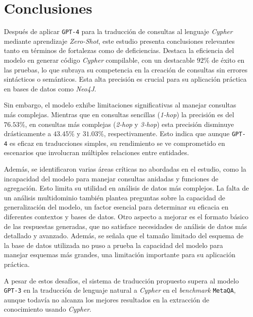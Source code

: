 \chapter*{Conclusiones}\label{chapter:conclusions}
Después de aplicar \texttt{GPT-4} para la traducción de consultas al lenguaje \textit{Cypher} mediante aprendizaje \textit{Zero-Shot}, este estudio presenta conclusiones relevantes tanto en términos de fortalezas como de deficiencias. Destaca la eficiencia del modelo en generar código \textit{Cypher} compilable, con un destacable $92\%$ de éxito en las pruebas, lo que subraya su competencia en la creación de consultas sin errores sintácticos o semánticos. Esta alta precisión es crucial para su aplicación práctica en bases de datos como \textit{Neo4J}.

Sin embargo, el modelo exhibe limitaciones significativas al manejar consultas más complejas. Mientras que en consultas sencillas (\textit{1-hop}) la precisión es del $76.53\%$, en consultas más complejas (\textit{2-hop} y \textit{3-hop}) esta precisión disminuye drásticamente a $43.45\%$ y $31.03\%$, respectivamente. Esto indica que aunque \texttt{GPT-4} es eficaz en traducciones simples, su rendimiento se ve comprometido en escenarios que involucran múltiples relaciones entre entidades.

Además, se identificaron varias áreas críticas no abordadas en el estudio, como la incapacidad del modelo para manejar consultas anidadas y funciones de agregación. Esto limita su utilidad en análisis de datos más complejos. La falta de un análisis multidominio también plantea preguntas sobre la capacidad de generalización del modelo, un factor esencial para determinar su eficacia en diferentes contextos y bases de datos. Otro aspecto a mejorar es el formato básico de las respuestas generadas, que no satisface necesidades de análisis de datos más detallado y avanzado. Además, se señala que el tamaño limitado del esquema de la base de datos utilizada no puso a prueba la capacidad del modelo para manejar esquemas más grandes, una limitación importante para su aplicación práctica.

A pesar de estos desafíos, el sistema de traducción propuesto supera al modelo \texttt{GPT-3} en la traducción de lenguaje natural a \textit{Cypher} en el \textit{benchmark} \texttt{MetaQA}, aunque todavía no alcanza los mejores resultados en la extracción de conocimiento usando \textit{Cypher}. 

